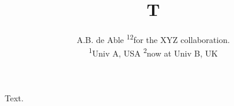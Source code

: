 \documentclass{article}
\providecommand\IEEEauthorblockN[1]{#1}
\providecommand\IEEEauthorblockA[1]{#1}
\providecommand\IEEEauthorrefmark[1]{\textsuperscript{#1}}
\begin{document}
\title{T}
\author{\IEEEauthorblockN{A.B. de Able \IEEEauthorrefmark{1}\IEEEauthorrefmark{2}for the XYZ collaboration.}
  \\
\IEEEauthorblockA{\IEEEauthorrefmark{1}Univ A, USA}
\IEEEauthorblockA{\IEEEauthorrefmark{2}now at Univ B, UK}}
\maketitle
Text.
\end{document}
